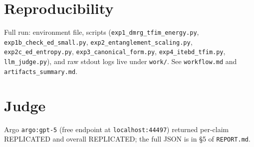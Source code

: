 \documentclass[11pt]{article}
\begin{document}
\section{Reproducibility}
Full run: environment file, scripts (\texttt{exp1\_dmrg\_tfim\_energy.py}, \texttt{exp1b\_check\_ed\_small.py},
\texttt{exp2\_entanglement\_scaling.py}, \texttt{exp2c\_ed\_entropy.py}, \texttt{exp3\_canonical\_form.py},
\texttt{exp4\_itebd\_tfim.py}, \texttt{llm\_judge.py}), and raw stdout logs live under \texttt{work/}.
See \texttt{workflow.md} and \texttt{artifacts\_summary.md}.

\section{Judge}
Argo \texttt{argo:gpt-5} (free endpoint at \texttt{localhost:44497}) returned per-claim REPLICATED and
overall REPLICATED; the full JSON is in \S5 of \texttt{REPORT.md}.
\end{document}
